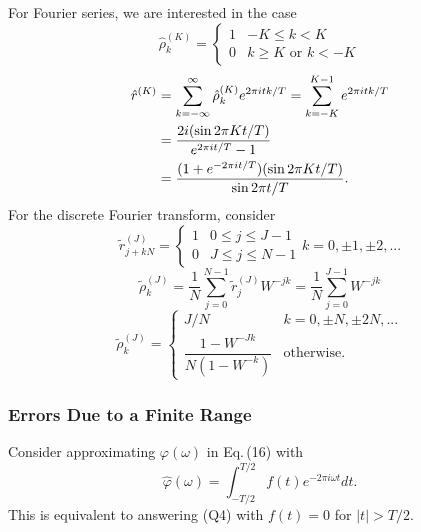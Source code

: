 \documentclass[twoside]{MATH77}
\begin{document}
For Fourier series, we are interested in the case
\begin{equation}\label{O33}
\hat \rho _k^{(K)}=
\begin{cases}
1 & -K\leq k<K \\
0 & k\geq K\text{ or }k<-K
\end{cases}
\end{equation}
\vspace{-10pt}
\begin{equation}\label{O34}
\begin{split}
\displaystyle\hat r^{(K)}&=\sum_{k=-\infty }^\infty \hat \rho _k^{(K)}e^{2\pi
itk/T}=\sum_{k=-K}^{K-1}e^{2\pi itk/T}\vspace{4pt} \\
\displaystyle &=\dfrac{2i(\sin 2\pi Kt/T)}{e^{2\pi it/T}-1}\vspace{4pt}\\
\displaystyle &=\dfrac{(1+e^{-2\pi it/T})(\sin 2\pi Kt/T)}{\sin 2\pi t/T}.
\end{split}
\end{equation}
For the discrete Fourier transform, consider
\begin{equation}\label{O35}
\tilde r_{j+kN}^{(J)}=
\begin{cases}
1 & 0\leq j\leq J-1 \\
0 & J\leq j\leq N-1
\end{cases}
k=0,\pm 1,\pm 2,...
\end{equation}
\begin{equation*}
\tilde \rho _k^{(J)}=\frac 1N\sum_{j=0}^{N-1}\tilde r_j^{(J)}W^{-jk}=\frac
1N\sum_{j=0}^{J-1}W^{-jk}
\end{equation*}
\begin{equation}\label{O36}
\tilde \rho _k^{(J)}=
\begin{cases}
J/N & k=0,\pm N,\pm 2N,...\\
\dfrac{1-W^{-Jk}}{N(1-W^{-k})} & \text{otherwise.}
\end{cases}
\end{equation}

\subsubsection{Errors Due to a Finite Range}

Consider approximating $\varphi (\omega )$ in Eq.\,(16) with
\begin{equation}\label{O37}
\hat \varphi (\omega )=\int_{-T/2}^{T/2}f(t)e^{-2\pi i\omega t}dt.
\end{equation}
This is equivalent to answering (Q4) with $f(t)=0$ for $|t|>T/2.$
\end{document}
